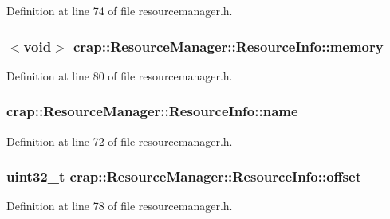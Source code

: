 Definition at line 74 of file resourcemanager.\+h.

\hypertarget{structcrap_1_1_resource_manager_1_1_resource_info_a854be7aa2133e5f0163068358fc8dce6}{
\subsubsection[{memory}]{$<$void$>$ crap\+::\+Resource\+Manager\+::\+Resource\+Info\+::memory}}\label{structcrap_1_1_resource_manager_1_1_resource_info_a854be7aa2133e5f0163068358fc8dce6}


Definition at line 80 of file resourcemanager.\+h.

\hypertarget{structcrap_1_1_resource_manager_1_1_resource_info_a98faef0a51ed7c88122b97715f94dabb}{
\subsubsection[{name}]{ crap\+::\+Resource\+Manager\+::\+Resource\+Info\+::name}}\label{structcrap_1_1_resource_manager_1_1_resource_info_a98faef0a51ed7c88122b97715f94dabb}


Definition at line 72 of file resourcemanager.\+h.

\hypertarget{structcrap_1_1_resource_manager_1_1_resource_info_ad2c655eaf108741d772e0905dc0daa6b}{
\subsubsection[{offset}]{\setlength{\rightskip}{0pt plus 5cm}uint32\+\_\+t crap\+::\+Resource\+Manager\+::\+Resource\+Info\+::offset}}\label{structcrap_1_1_resource_manager_1_1_resource_info_ad2c655eaf108741d772e0905dc0daa6b}


Definition at line 78 of file resourcemanager.\+h.

